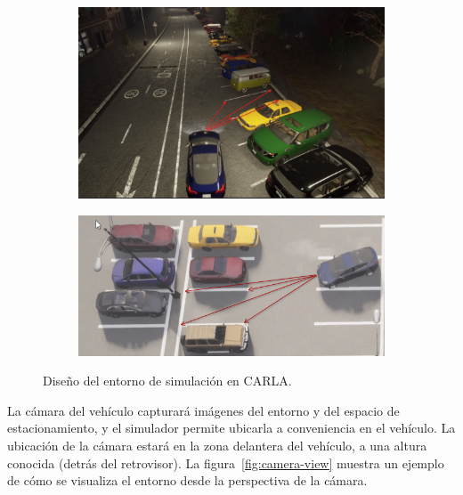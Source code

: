 \begin{figure}[!ht]
    \centering
    \begin{subfigure}{0.4\textwidth}
        \includegraphics[width=\textwidth]{img/distances}\label {fig:distances}
    \end{subfigure}
    \begin{subfigure}{0.4\textwidth}
        \includegraphics[width=\textwidth]{img/distances2}\label {fig:distances2}
    \end{subfigure}
    
    \caption{Diseño del entorno de simulación en CARLA.}
    \label{fig:simulation-design}
\end{figure}

\noindent
La cámara del vehículo capturará imágenes del entorno y del espacio de estacionamiento, y el simulador permite ubicarla a conveniencia en el vehículo.
La ubicación de la cámara estará en la zona delantera del vehículo, a una altura conocida (detrás del retrovisor).
La figura~\ref{fig:camera-view} muestra un ejemplo de cómo se visualiza el entorno desde la perspectiva de la cámara.

